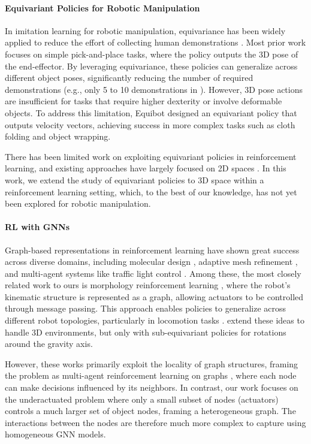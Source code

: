 \paragraph{Equivariant Policies for Robotic Manipulation}

In imitation learning for robotic manipulation, equivariance has been widely applied to reduce the effort of collecting human demonstrations \citep{zeng2020transporter, huang2022equi-trans, huang2024fourier, ryu2023diffusion, yang2024equibot}. Most prior work focuses on simple pick-and-place tasks, where the policy outputs the 3D pose of the end-effector. By leveraging equivariance, these policies can generalize across different object poses, significantly reducing the number of required demonstrations (e.g., only 5 to 10 demonstrations in \citep{ryu2023diffusion}). However, 3D pose actions are insufficient for tasks that require higher dexterity or involve deformable objects. To address this limitation, Equibot \citep{yang2024equibot} designed an equivariant policy that outputs velocity vectors, achieving success in more complex tasks such as cloth folding and object wrapping. 

There has been limited work on exploiting equivariant policies in reinforcement learning, and existing approaches have largely focused on 2D spaces \citep{wang2022so2equivariant, nguyen2023equivariant}. In this work, we extend the study of equivariant policies to 3D space within a reinforcement learning setting, which, to the best of our knowledge, has not yet been explored for robotic manipulation.


\paragraph{RL with GNNs}

Graph-based representations in reinforcement learning have shown great success across diverse domains, including molecular design \citep{simm2021symmetryaware}, adaptive mesh refinement \citep{freymuth2023swarm}, and multi-agent systems like traffic light control \citep{pol2022multiagent}. Among these, the most closely related work to ours is morphology reinforcement learning \citep{wang2018nervenet, huang2020smp, pmlr-v162-trabucco22b, hong2022structureaware, gupta2022metamorph}, where the robot’s kinematic structure is represented as a graph, allowing actuators to be controlled through message passing. This approach enables policies to generalize across different robot topologies, particularly in locomotion tasks \citep{gupta2022metamorph}. \citet{chen2023sgrl} extend these ideas to handle 3D environments, but only with sub-equivariant policies for rotations around the gravity axis.

However, these works primarily exploit the locality of graph structures, framing the problem as multi-agent reinforcement learning on graphs \citep{Jiang2020Graph}, where each node can make decisions influenced by its neighbors. In contrast, our work focuses on the underactuated problem where only a small subset of nodes (actuators) controls a much larger set of object nodes, framing a heterogeneous graph. The interactions between the nodes are therefore much more complex to capture using homogeneous GNN models.
